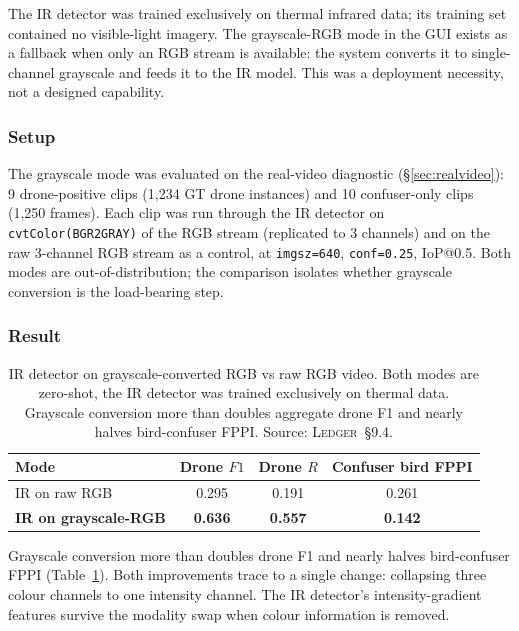 The IR detector was trained exclusively on thermal infrared data; its training set contained no visible-light imagery. The grayscale-RGB mode in the GUI exists as a fallback when only an RGB stream is available: the system converts it to single-channel grayscale and feeds it to the IR model. This was a deployment necessity, not a designed capability.

\subsubsection{Setup}

The grayscale mode was evaluated on the real-video diagnostic (\S\ref{sec:realvideo}): 9 drone-positive clips (1{,}234 GT drone instances) and 10 confuser-only clips (1{,}250 frames). Each clip was run through the IR detector on \texttt{cvtColor(BGR2GRAY)} of the RGB stream (replicated to 3 channels) and on the raw 3-channel RGB stream as a control, at \texttt{imgsz=640}, \texttt{conf=0.25}, IoP@0.5. Both modes are out-of-distribution; the comparison isolates whether grayscale conversion is the load-bearing step.

\subsubsection{Result}

\begin{table}[htbp]
    \centering
    \caption{IR detector on grayscale-converted RGB vs raw RGB video. Both modes are zero-shot, the IR detector was trained exclusively on thermal data. Grayscale conversion more than doubles aggregate drone F1 and nearly halves bird-confuser FPPI. Source: \textsc{Ledger}~\S9.4.}
    \label{tab:ir_grayscale}
    \begin{tabular}{lccc}
        \toprule
        Mode & Drone $F1$ & Drone $R$ & Confuser bird FPPI \\
        \midrule
        IR on raw RGB             & 0.295 & 0.191 & 0.261 \\
        \textbf{IR on grayscale-RGB} & \textbf{0.636} & \textbf{0.557} & \textbf{0.142} \\
        \bottomrule
    \end{tabular}
\end{table}

Grayscale conversion more than doubles drone F1 and nearly halves bird-confuser FPPI (Table~\ref{tab:ir_grayscale}). Both improvements trace to a single change: collapsing three colour channels to one intensity channel. The IR detector's intensity-gradient features survive the modality swap when colour information is removed.

